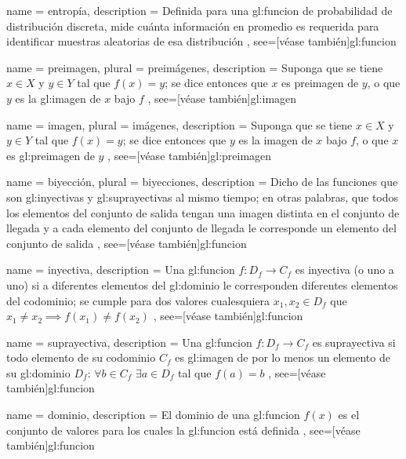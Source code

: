 {
  name = entropía,
  description = {
    Definida para una \gls{gl:funcion} de probabilidad de distribución discreta,
    mide cuánta información en promedio es requerida para identificar
    muestras aleatorias de esa distribución%
  },
  see=[véase también]{gl:funcion}
}

{
  name = preimagen,
  plural = preimágenes,
  description = {
    Suponga que se tiene $x \in X$ y $y \in Y$ tal que $f(x) = y$;
    se dice entonces que $x$ es preimagen de $y$, o que
    $y$ es la \gls{gl:imagen} de $x$ bajo $f$%
  },
  see=[véase también]{gl:imagen}
}

{
  name = imagen,
  plural = imágenes,
  description = {
    Suponga que se tiene $x \in X$ y $y \in Y$ tal que $f(x) = y$;
    se dice entonces que $y$ es la imagen de $x$ bajo $f$,
    o que $x$ es \gls{gl:preimagen} de $y$%
  },
  see=[véase también]{gl:preimagen}
}

{
  name = biyección,
  plural = biyecciones,
  description = {
    Dicho de las funciones que son \glspl{gl:inyectiva} y
    \glspl{gl:suprayectiva} al mismo tiempo; en otras palabras, que todos los
    elementos del conjunto de salida tengan una imagen distinta en el conjunto
    de llegada y a cada elemento del conjunto de llegada le corresponde
    un elemento del conjunto de salida%
  },
  see=[véase también]{gl:funcion}
}


{
  name = inyectiva,
  description = {
    Una \gls{gl:funcion} $f:D_f \rightarrow C_f$ es inyectiva (o uno a
    uno) si a diferentes elementos del \gls{gl:dominio} le corresponden
    diferentes elementos del codominio; se cumple para dos
    valores cualesquiera $x_1, x_2 \in D_f$ que
    $x_1 \neq x_2 \implies f(x_1) \neq f(x_2)$%
  },
  see=[véase también]{gl:funcion}
}

{
  name = suprayectiva,
  description = {
    Una \gls{gl:funcion} $f:D_f \rightarrow C_f$ es suprayectiva si
    todo elemento de su codominio $C_f$ es \gls{gl:imagen} de
    por lo menos un elemento de su \gls{gl:dominio} $D_f$: $\forall b \in C_f$
    $\exists a \in D_f$ tal que $f(a)=b$%
  },
  see=[véase también]{gl:funcion}
}

{
  name = dominio,
  description = {
    El dominio de una \gls{gl:funcion} $f(x)$ es el conjunto de valores
    para los cuales la \gls{gl:funcion} está definida%
  },
  see=[véase también]{gl:funcion}
}

